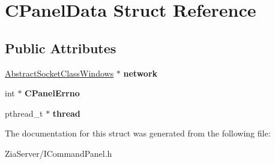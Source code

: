 \hypertarget{struct_c_panel_data}{
\section{CPanelData Struct Reference}
\label{struct_c_panel_data}
}
\subsection*{Public Attributes}
\begin{DoxyCompactItemize}
\item 
\hypertarget{struct_c_panel_data_a6d94c2ba25e461a028fa438ed9b73641}{
\hyperlink{class_abstract_socket_class_windows}{AbstractSocketClassWindows} $\ast$ {\bfseries network}}
\label{struct_c_panel_data_a6d94c2ba25e461a028fa438ed9b73641}

\item 
\hypertarget{struct_c_panel_data_a6768b2edcb478e0f15f20cf7d5e73943}{
int $\ast$ {\bfseries CPanelErrno}}
\label{struct_c_panel_data_a6768b2edcb478e0f15f20cf7d5e73943}

\item 
\hypertarget{struct_c_panel_data_ae94d23f4794c1da621be7faf37022327}{
pthread\_\-t $\ast$ {\bfseries thread}}
\label{struct_c_panel_data_ae94d23f4794c1da621be7faf37022327}

\end{DoxyCompactItemize}


The documentation for this struct was generated from the following file:\begin{DoxyCompactItemize}
\item 
ZiaServer/ICommandPanel.h\end{DoxyCompactItemize}
